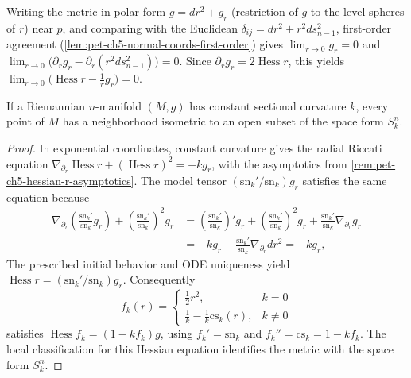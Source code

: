 \begin{remark}
  \label{rem:pet-ch5-hessian-r-asymptotics}

  Writing the metric in polar form $g=dr^2+g_r$ (restriction of $g$ to the level
  spheres of $r$) near $p$, and comparing with the Euclidean
  $\delta_{ij}=dr^2+r^2ds_{n-1}^2$, first-order agreement
  (\cref{lem:pet-ch5-normal-coords-first-order}) gives $\lim_{r\to0}g_r=0$ and
  $\lim_{r\to0}\big(\partial_rg_r-\partial_r(r^2ds_{n-1}^2)\big)=0$. Since
  $\partial_rg_r=2\operatorname{Hess}r$, this yields
  $\lim_{r\to0}\big(\operatorname{Hess}r-\tfrac1rg_r\big)=0$.
\end{remark}

\begin{theorem}
  \label{thm:pet-ch5-riemann-constant-curvature-local}

  If a Riemannian $n$-manifold $(M,g)$ has constant sectional curvature $k$, every
  point of $M$ has a neighborhood isometric to an open subset of the space form
  $S^n_k$.
\end{theorem}
\begin{proof}
  \sketch
  In exponential coordinates, constant curvature gives the radial Riccati equation
  $\nabla_{\partial_r}\operatorname{Hess}r+(\operatorname{Hess}r)^2=-kg_r$, with
  the asymptotics from \cref{rem:pet-ch5-hessian-r-asymptotics}.  The model
  tensor $(\mathrm{sn}_k'/\mathrm{sn}_k)g_r$ satisfies the same equation because
  \begin{align*}
    \nabla_{\partial_r}\!\left(\frac{\mathrm{sn}_k'}{\mathrm{sn}_k}g_r\right)
    +\left(\frac{\mathrm{sn}_k'}{\mathrm{sn}_k}\right)^2g_r
    &=\left(\frac{\mathrm{sn}_k'}{\mathrm{sn}_k}\right)'g_r
    +\left(\frac{\mathrm{sn}_k'}{\mathrm{sn}_k}\right)^2g_r
    +\frac{\mathrm{sn}_k'}{\mathrm{sn}_k}\nabla_{\partial_r}g_r\\
    &=-kg_r-\frac{\mathrm{sn}_k'}{\mathrm{sn}_k}\nabla_{\partial_r}dr^2=-kg_r,
  \end{align*}
  The prescribed initial behavior and ODE uniqueness yield
  $\operatorname{Hess}r=(\mathrm{sn}_k'/\mathrm{sn}_k)g_r$.  Consequently
  \[
    f_k(r)=\begin{cases}\tfrac12r^2,&k=0\\ \tfrac1k-\tfrac1k\mathrm{cs}_k(r),&k\ne0\end{cases}
  \]
  satisfies $\operatorname{Hess}f_k=(1-kf_k)g$, using
  $f_k'=\mathrm{sn}_k$ and $f_k''=\mathrm{cs}_k=1-kf_k$.  The local classification
  for this Hessian equation identifies the metric with the space form $S_k^n$.
\end{proof}

